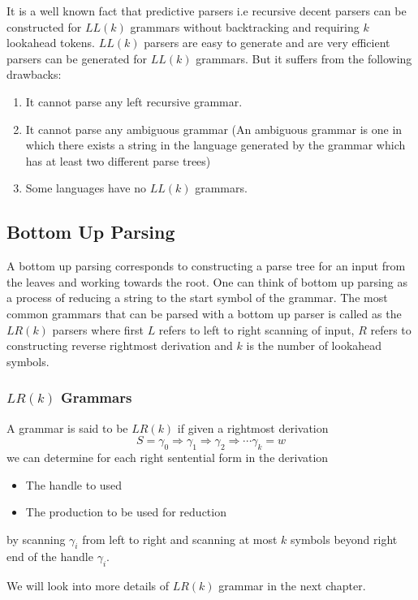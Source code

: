 \documentclass[oneside]{book}
\begin{document}
 It is a well known fact that predictive parsers i.e recursive decent parsers can be constructed for $LL(k)$ grammars without backtracking and requiring $k$ lookahead tokens. $LL(k)$ parsers are easy to generate and are very efficient parsers can be generated for $LL(k)$ grammars. But it suffers from the following drawbacks:
 
 \begin{enumerate}
 \item It cannot parse any left recursive grammar.
 \item It cannot parse any ambiguous grammar (An ambiguous grammar is one in which there exists a string in the language generated by the grammar which has at least two different parse trees)
 \item Some languages have no $LL(k)$ grammars.
 
 \end{enumerate}
 
 \subsection{Bottom Up Parsing}
 A bottom up parsing corresponds to constructing a parse tree for an input from the leaves and working towards the root. One can think of bottom up parsing as a process of reducing a string to the start symbol of the grammar. The most common grammars that can be parsed with a bottom up parser is called as the $LR(k)$ parsers where first $L$ refers to left to right scanning of input, $R$ refers to constructing reverse rightmost derivation and $k$ is the number of lookahead symbols.
 
\subsubsection*{$LR(k)$ Grammars} 

A grammar is said to be $LR(k)$ if given a rightmost derivation 
$$
S = \gamma_0 \Rightarrow \gamma_1 \Rightarrow \gamma_2 \Rightarrow \cdots \gamma_k = w
$$
we can determine for each right sentential form in the derivation
\begin{itemize}
\item The handle to used 
\item The production to be used for reduction  
\end{itemize}
by scanning $\gamma_i$ from left to right and scanning at most $k$ symbols beyond right end of the handle $\gamma_i$.

We will look into more details of $LR(k)$ grammar in the next chapter.
\end{document}
